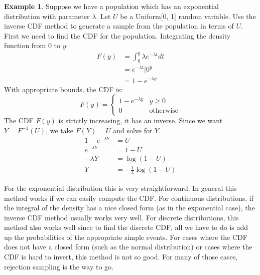 \documentclass[12pt]{article}
\theoremstyle{definition}
\newtheorem*{example}{Example}
\theoremstyle{remark}
\begin{document}
\begin{example}Suppose we have a population which has an exponential distribution with parameter $\lambda$. Let $U$ be a Uniform[0, 1] random variable. Use the inverse CDF method to generate a sample from the population in terms of $U$.\\

First we need to find the CDF for the population. Integrating the density function from 0 to $y$:
\begin{align*}
F(y) &= \int_0^y \lambda e^{-\lambda t} dt \\
&= e^{-\lambda t}\Bigr|0^y \\
&= 1 - e^{-\lambda y}
\end{align*}
With appropriate bounds, the CDF is:
\[
F(y) = \begin{cases}
1 - e^{-\lambda y} & y \geq 0 \\
0 & \text{otherwise}
\end{cases}
\]
The CDF $F(y)$ is strictly increasing, it has an inverse. Since we want $Y = F^{-1}(U)$, we take $F(Y) = U$ and solve for $Y$.
\begin{align*}
1 - e^{-\lambda Y} &= U \\
e^{-\lambda Y} &= 1 - U \\
-\lambda Y &= \log(1 - U) \\
Y &= - \frac{1}{\lambda} \log(1 - U)
\end{align*}
\end{example}
For the exponential distribution this is very straightforward. In general this method works if we can easily compute the CDF. For continuous distributions, if the integral of the density has a nice closed form (as in the exponential case), the inverse CDF method usually works very well. For discrete distributions, this method also works well since to find the discrete CDF, all we have to do is add up the probabilities of the appropriate simple events. For cases where the CDF does not have a closed form (such as the normal distribution) or cases where the CDF is hard to invert, this method is not so good. For many of those cases, rejection sampling is the way to go.
\end{document}
